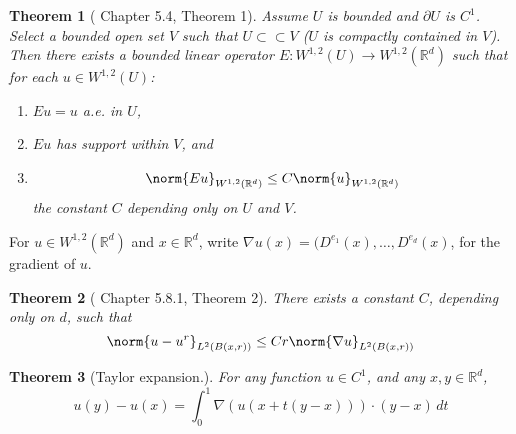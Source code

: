 \documentclass{article}
\newcommand{\Reals}{\mathbb{R}}
\newcommand{\1}{\mathbf{1}}
\newcommand{\Rd}{\Reals^d}
\theoremstyle{alden}
\theoremstyle{aldenthm}
\newtheorem{theorem}{Theorem}
\theoremstyle{definition}
\theoremstyle{remark}
\begin{document}
\begin{theorem}[\citep{evans10} Chapter 5.4, Theorem 1]
	\label{thm:evans_extension}
	Assume $U$ is bounded and $\partial U$ is $C^1$. Select a bounded open set $V$ such that $U \subset \subset V$ ($U$ is compactly contained in $V$). Then there exists a bounded linear operator $E: W^{1,2}(U) \to W^{1,2}(\Rd)$ such that for each $u \in W^{1,2}(U)$:
	\begin{enumerate}
		\item $Eu = u$ a.e. in $U$,
		\item $Eu$ has support within $V$, and 
		\item 
		\begin{equation*}
		\norm{Eu}_{W^{1,2}(\Rd)} \leq C \norm{u}_{W^{1,2}(\Rd)}
		\end{equation*}
		the constant $C$ depending only on $U$ and $V$.
	\end{enumerate}
\end{theorem}

For $u \in W^{1,2}(\Rd)$ and $x \in \Rd$, write $\nabla u(x) = (D^{e_1}(x),\ldots,D^{e_d}(x)$, for the gradient of $u$.

\begin{theorem}[\citep{evans10} Chapter 5.8.1, Theorem 2]
	\label{thm:evans_poincare}
	There exists a constant $C$, depending only on $d$, such that
	\begin{equation*}
	\norm{u - u^r}_{L^2(B(x,r))} \leq Cr\norm{\nabla u}_{L^2(B(x,r))}
	\end{equation*}
\end{theorem}

\begin{theorem}[Taylor expansion.]
	\label{thm:taylor_expansion}
	For any function $u \in C^1$, and any $x,y \in \Rd$, 
	\begin{equation*}
	u(y) - u(x) = \int_{0}^{1} \nabla(u(x + t(y - x))) \cdot (y - x) \,dt
	\end{equation*}
\end{theorem}
\end{document}
